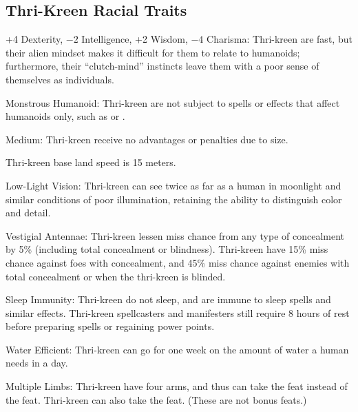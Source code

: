 

\subsection{Thri-Kreen Racial Traits}
\begin{itemize*}
    \item +4 Dexterity, $-2$ Intelligence, +2 Wisdom, $-4$ Charisma: Thri-kreen are fast, but their alien mindset makes it difficult for them to relate to humanoids; furthermore, their ``clutch-mind'' instincts leave them with a poor sense of themselves as individuals.
    \item Monstrous Humanoid: Thri-kreen are not subject to spells or effects that affect humanoids only, such as  or .
    \item Medium: Thri-kreen receive no advantages or penalties due to size.
    \item Thri-kreen base land speed is 15 meters.

    \item Low-Light Vision: Thri-kreen can see twice as far as a human in moonlight and similar conditions of poor illumination, retaining the ability to distinguish color and detail.
    \item Vestigial Antennae: Thri-kreen lessen miss chance from any type of concealment by 5\% (including total concealment or blindness). Thri-kreen have 15\% miss chance against foes with concealment, and 45\% miss chance against enemies with total concealment or when the thri-kreen is blinded.

    \item Sleep Immunity: Thri-kreen do not sleep, and are immune to sleep spells and similar effects. Thri-kreen spellcasters and manifesters still require 8 hours of rest before preparing spells or regaining power points.
    \item Water Efficient: Thri-kreen can go for one week on the amount of water a human needs in a day.
    \item Multiple Limbs: Thri-kreen have four arms, and thus can take the  feat instead of the  feat. Thri-kreen can also take the  feat. (These are not bonus feats.)


\end{itemize*}
